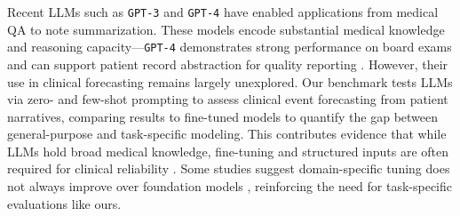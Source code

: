 Recent LLMs such as \texttt{GPT-3} and \texttt{GPT-4} have enabled applications from medical QA to note summarization.
These models encode substantial medical knowledge and reasoning capacity—\texttt{GPT-4} demonstrates strong performance on board exams and can support patient record abstraction for quality reporting \citep{boussina2024large}.
However, their use in clinical forecasting remains largely unexplored.
Our benchmark tests LLMs via zero- and few-shot prompting to assess clinical event forecasting from patient narratives, comparing results to fine-tuned models to quantify the gap between general-purpose and task-specific modeling.
This contributes evidence that while LLMs hold broad medical knowledge, fine-tuning and structured inputs are often required for clinical reliability \citep{huang2019clinicalbert,gu2021domain}.
Some studies suggest domain-specific tuning does not always improve over foundation models \citep{jeong2024medical}, reinforcing the need for task-specific evaluations like ours.


